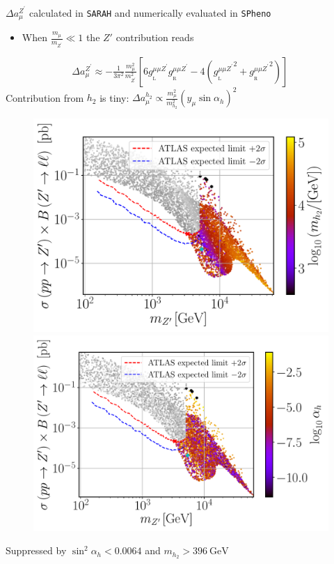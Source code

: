 \documentclass[10pt,xcolor=dvipsnames,mathserif]{beamer}
\renewcommand{\(}{\left(}
\renewcommand{\)}{\right)}
\renewcommand{\[}{\left[}
\renewcommand{\]}{\right]}
\newcommand{\g}[2]{g_{_\mathrm{#1}}^{#2}}
\begin{document}
\begin{frame}
$\Delta a_\mu^{Z^\prime}$ calculated in \texttt{SARAH} and numerically evaluated in \texttt{SPheno}
			\vskip2mm				
\begin{itemize}
	\item When $\tfrac{m_\mu}{m_{Z^\prime}} \ll 1 $ the $Z'$ contribution reads
\end{itemize}
				\begin{equation*}
				\Delta a_\mu^{Z^\prime} \approx -\tfrac{1}{3 \pi^2} \tfrac{m_\mu^2}{m_{Z^\prime}^2} \[6 \g{L}{\mu \mu Z^\prime} \g{R}{\mu \mu Z^\prime} - 4 \({\g{L}{\mu \mu Z^\prime}}^2 + {\g{R}{\mu \mu Z^\prime}}^2\) \]\,
				\end{equation*}
Contribution from $h_2$ is tiny: $\Delta a_\mu^{h_2} \propto \tfrac{m_\mu^2}{m_{h_2}^2}\(y_\mu \sin \alpha_h\)^2$
\vskip-2mm
\begin{figure}[!h]
	\includegraphics[scale=0.28
	]{mZp_Xsec_mh2.pdf}\qquad
	\includegraphics[scale=0.28
	]{mZp_Xsec_alpha.pdf}
\end{figure}	
Suppressed by $\sin^2 \alpha_h < 0.0064$ and $m_{h_2} > 396~\mathrm{GeV}$
\end{frame}
\end{document}
